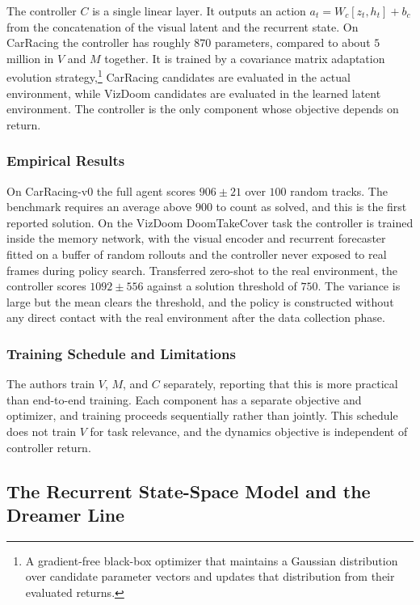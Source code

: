 The controller $C$ is a single linear layer. It outputs an action $a_t = W_c [z_t, h_t] + b_c$ from the concatenation of the visual latent and the recurrent state. On CarRacing the controller has roughly $870$ parameters, compared to about $5$ million in $V$ and $M$ together. It is trained by a covariance matrix adaptation evolution strategy,\footnote{A gradient-free black-box optimizer that maintains a Gaussian distribution over candidate parameter vectors and updates that distribution from their evaluated returns.} CarRacing candidates are evaluated in the actual environment, while VizDoom candidates are evaluated in the learned latent environment. The controller is the only component whose objective depends on return.

\subsubsection{Empirical Results}
\label{section:fc_ha_schmidhuber_empirics}

On CarRacing-v0 the full agent scores $906 \pm 21$ over $100$ random tracks. The benchmark requires an average above $900$ to count as solved, and this is the first reported solution. On the VizDoom DoomTakeCover task the controller is trained inside the memory network, with the visual encoder and recurrent forecaster fitted on a buffer of random rollouts and the controller never exposed to real frames during policy search. Transferred zero-shot to the real environment, the controller scores $1092 \pm 556$ against a solution threshold of $750$. The variance is large but the mean clears the threshold, and the policy is constructed without any direct contact with the real environment after the data collection phase.

\subsubsection{Training Schedule and Limitations}
\label{section:fc_ha_schmidhuber_reading}

The authors train $V$, $M$, and $C$ separately, reporting that this is more practical than end-to-end training. Each component has a separate objective and optimizer, and training proceeds sequentially rather than jointly. This schedule does not train $V$ for task relevance, and the dynamics objective is independent of controller return.

\subsection{The Recurrent State-Space Model and the Dreamer Line}
\label{section:fc_rssm}

